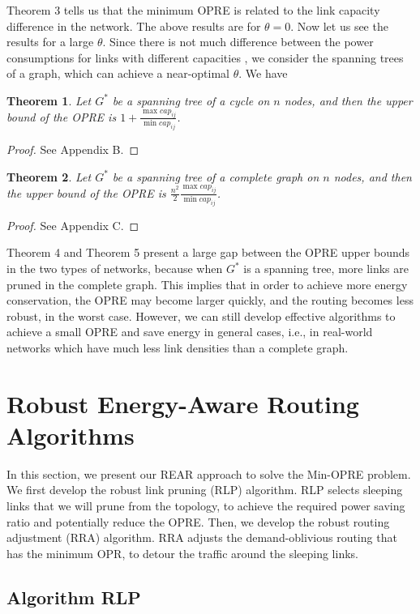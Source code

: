 \documentclass[conference]{IEEEtran}
\newtheorem{theorem}{Theorem}
\begin{document}
Theorem 3 tells us that the minimum OPRE is related to the link capacity difference in the network. The above results are for $\theta = 0$. Now let us see the results for a large $\theta$. Since there is not much difference between the power consumptions for links with different capacities \cite{networking:greenfrr}, we consider the spanning trees of a graph, which can achieve a near-optimal $\theta$. We have
\begin{theorem}
Let $G^*$ be a spanning tree of a cycle on $n$ nodes, and then the upper bound of the OPRE is $1 + \frac{\max cap_{ij}}{\min cap_{ij}}$.
\end{theorem}
\begin{proof}
See Appendix B.
\end{proof}
\begin{theorem}
Let $G^*$ be a spanning tree of a complete graph on $n$ nodes, and then the upper bound of the OPRE is $\frac{n^2}{2} \frac{\max cap_{ij}}{\min cap_{ij}}$.
\end{theorem}
\begin{proof}
See Appendix C.
\end{proof}

Theorem 4 and Theorem 5 present a large gap between the OPRE upper bounds in the two types of networks, because when $G^*$ is a spanning tree, more links are pruned in the complete graph. This implies that in order to achieve more energy conservation, the OPRE may become larger quickly, and the routing becomes less robust, in the worst case. However, we can still develop effective algorithms to achieve a small OPRE and save energy in general cases, i.e., in real-world networks which have much less link densities than a complete graph.


\section{Robust Energy-Aware Routing Algorithms}
\label{robust_energy_aware_routing_algorithms}

In this section, we present our REAR approach to solve the Min-OPRE problem. We first develop the robust link pruning (RLP) algorithm. RLP selects sleeping links that we will prune from the topology, to achieve the required power saving ratio and potentially reduce the OPRE. Then, we develop the robust routing adjustment (RRA) algorithm. RRA adjusts the demand-oblivious routing that has the minimum OPR, to detour the traffic around the sleeping links.

\subsection{Algorithm RLP}
\end{document}
